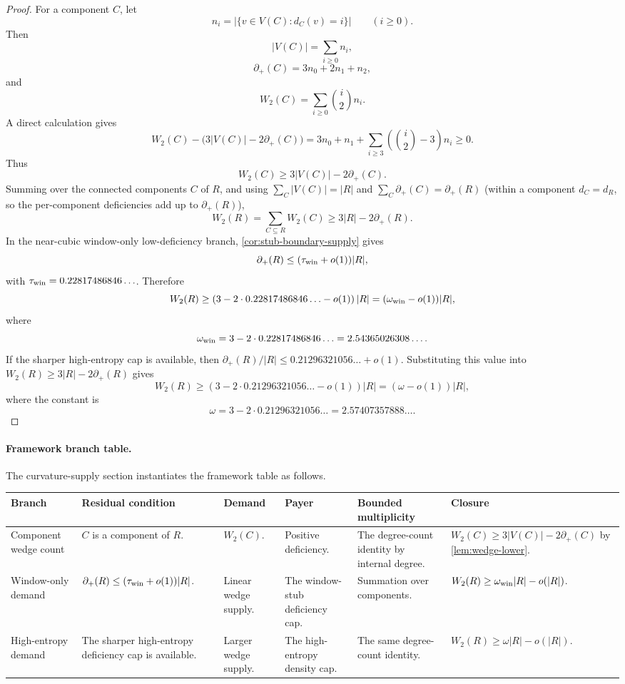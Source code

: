 \documentclass[11pt]{article}
\newcommand{\defp}{\partial_+}
\newcommand{\FrameworkBranchTableHeader}{%
\toprule
\textbf{Branch} & \textbf{Residual condition} & \textbf{Demand} & \textbf{Payer} & \textbf{Bounded multiplicity} & \textbf{Closure}\\
\midrule
}
\begin{document}
\begin{proof}
For a component $C$, let
\[
n_i=|\{v\in V(C):d_C(v)=i\}|\qquad(i\ge0).
\]
Then
\[
|V(C)|=\sum_{i\ge0}n_i,
\]
\[
\defp(C)=3n_0+2n_1+n_2,
\]
and
\[
W_2(C)=\sum_{i\ge0}\binom i2 n_i.
\]
A direct calculation gives
\[
W_2(C)-\bigl(3|V(C)|-2\defp(C)\bigr)
=3n_0+n_1+\sum_{i\ge3}\left(\binom i2-3\right)n_i\ge0.
\]
Thus
\[
W_2(C)\ge3|V(C)|-2\defp(C).
\]
Summing over the connected components $C$ of $R$, and using $\sum_C|V(C)|=|R|$ and $\sum_C\defp(C)=\defp(R)$ (within a component $d_C=d_R$, so the per-component deficiencies add up to $\defp(R)$),
\[
W_2(R)=\sum_{C\subseteq R}W_2(C)\ge 3|R|-2\defp(R).
\]
In the near-cubic window-only low-deficiency branch,
\cref{cor:stub-boundary-supply} gives
\[
\defp(R)\le(\tau_{\rm win}+o(1))|R|,
\]
with
$\tau_{\rm win}=0.22817486846\ldots$.  Therefore
\[
W_2(R)\ge
\left(3-2\cdot0.22817486846\ldots-o(1)\right)|R|
=(\omega_{\rm win}-o(1))|R|,
\]
where
\[
\omega_{\rm win}=3-2\cdot0.22817486846\ldots=2.54365026308\ldots .
\]
If the sharper high-entropy cap is available, then
$\defp(R)/|R|\le0.21296321056\ldots+o(1)$.  Substituting this value into
\(W_2(R)\ge3|R|-2\defp(R)\) gives
\[
W_2(R)\ge\left(3-2\cdot0.21296321056\ldots-o(1)\right)|R|=(\omega-o(1))|R|,
\]
where the constant is
\[
\omega=3-2\cdot0.21296321056\ldots=2.57407357888\ldots.
\]
\end{proof}

\paragraph{Framework branch table.}
The curvature-supply section instantiates the framework table as follows.
\begin{longtable}{L{0.13\textwidth} L{0.19\textwidth} L{0.14\textwidth} L{0.14\textwidth} L{0.17\textwidth} L{0.17\textwidth}}
\FrameworkBranchTableHeader
Component wedge count
&
\(C\) is a component of \(R\).
&
\(W_2(C)\).
&
Positive deficiency.
&
The degree-count identity by internal degree.
&
\(W_2(C)\ge3|V(C)|-2\defp(C)\) by \cref{lem:wedge-lower}.
\\
\addlinespace
Window-only demand
&
\(\defp(R)\le(\tau_{\rm win}+o(1))|R|\).
&
Linear wedge supply.
&
The window-stub deficiency cap.
&
Summation over components.
&
\(W_2(R)\ge\omega_{\rm win}|R|-o(|R|)\).
\\
\addlinespace
High-entropy demand
&
The sharper high-entropy deficiency cap is available.
&
Larger wedge supply.
&
The high-entropy density cap.
&
The same degree-count identity.
&
\(W_2(R)\ge\omega|R|-o(|R|)\).
\\
\bottomrule
\end{longtable}
\end{document}
